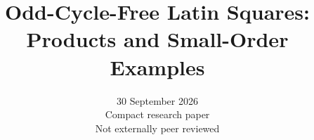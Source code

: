 \documentclass[11pt]{article}
\title{Odd-Cycle-Free Latin Squares:\\Products and Small-Order Examples}
\author{}
\date{30 September 2026\\\small Compact research paper\\Not externally peer reviewed}
\begin{document}
\dossierfrontmatter









\dossierreferences
\end{document}
